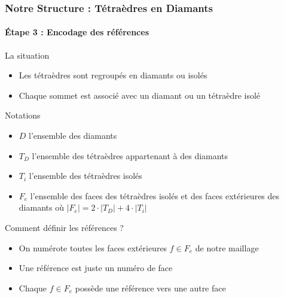 \documentclass[9pt]{beamer}
\begin{document}
\begin{frame}
\small
\frametitle{Notre Structure : Tétraèdres en Diamants}
\framesubtitle{\'{E}tape 3 : Encodage des références}
\small
\begin{block}{La situation}
\begin{itemize}
\item Les tétraèdres sont regroupés en diamants ou isolés
\item Chaque sommet est associé avec un diamant ou un tétraèdre isolé
\end{itemize}
\end{block}

\begin{block}{Notations}
\begin{itemize}
\item $D$ l'ensemble des diamants
\item $T_D$ l'ensemble des tétraèdres appartenant à des diamants
\item $T_i$ l'ensemble des tétraèdres isolés
\item $F_e$ l'ensemble des faces des tétraèdres isolés et des faces extérieures des diamants où $|F_e|=2\cdot |T_D|+4\cdot |T_i|$\\
\end{itemize}
\end{block}

\begin{block}{Comment définir les références ?}
\begin{itemize}
\item On numérote toutes les faces extérieures $f \in F_e$ de notre maillage
\item Une référence est juste un numéro de face
\item Chaque $f \in F_e$ possède une référence vers une autre face
\end{itemize}
\end{block}

\end{frame}
\end{document}
